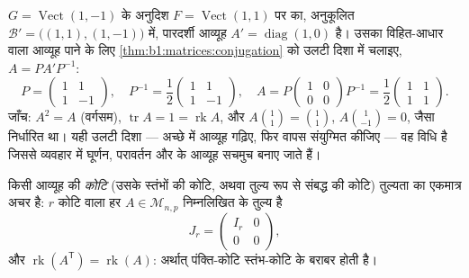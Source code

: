 \begin{example}[आधार-परिवर्तन, उलटी दिशा में चलाया हुआ]
\label{ex:b1:matrices:reverserun}
$G = \operatorname{Vect}(1,-1)$ के अनुदिश $F = \operatorname{Vect}(1,1)$ पर
 का, अनुकूलित  $\mathcal B' = \bigl((1,1),(1,-1)\bigr)$ में,
पारदर्शी आव्यूह $A' = \operatorname{diag}(1, 0)$ है। उसका विहित-आधार वाला
आव्यूह पाने के लिए \cref{thm:b1:matrices:conjugation} को उलटी दिशा में
चलाइए, $A = P A' P^{-1}$:
\[
P = \begin{pmatrix} 1 & 1\\ 1 & -1\end{pmatrix},
\quad
P^{-1} = \frac12\begin{pmatrix} 1 & 1\\ 1 & -1\end{pmatrix},
\quad
A = P\begin{pmatrix} 1 & 0\\ 0 & 0\end{pmatrix}P^{-1}
= \frac12\begin{pmatrix} 1 & 1\\ 1 & 1\end{pmatrix}.
\]
जाँच: $A^2 = A$ (वर्गसम), $\operatorname{tr} A = 1 = \operatorname{rk} A$,
और $A\binom{1}{1} = \binom11$, $A\binom{1}{-1} = 0$, जैसा निर्धारित था। यही
उलटी दिशा --- अच्छे  में आव्यूह गढ़िए, फिर वापस संयुग्मित कीजिए --- वह
विधि है जिससे व्यवहार में घूर्णन, परावर्तन और  के आव्यूह सचमुच बनाए
जाते हैं।
\end{example}

\begin{theorem}[कोटि मानक रूप]\label{thm:b1:matrices:rank}
किसी आव्यूह की \emph{कोटि} (उसके स्तंभों की कोटि, अथवा तुल्य रूप से संबद्ध
 की कोटि) तुल्यता का एकमात्र अचर है: $r$ कोटि वाला हर $A
\in \mathcal{M}_{n,p}$ निम्नलिखित के तुल्य है
\[
J_r = \begin{pmatrix} I_r & 0 \\ 0 & 0 \end{pmatrix},
\]
और $\operatorname{rk}(A^{\mathsf T}) = \operatorname{rk}(A)$: अर्थात्
पंक्ति-कोटि स्तंभ-कोटि के बराबर होती है।
\end{theorem}


